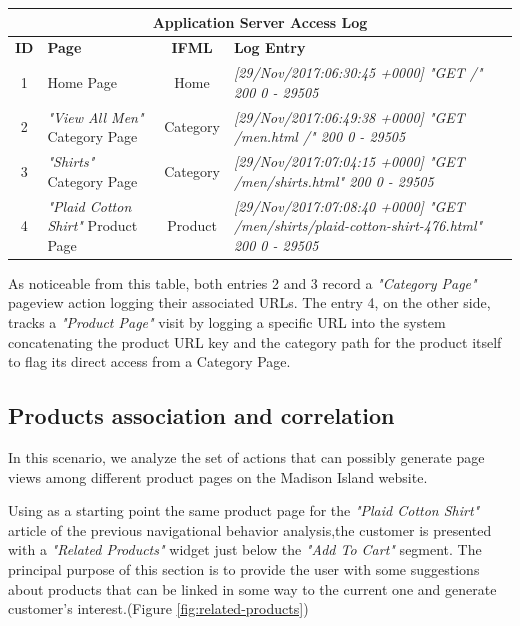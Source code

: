 \vspace{0.5cm}
\begin{center}
  \begin{tabular}{|c|p{3cm}|c|p{6cm}|}
  \hline
  \multicolumn{4}{|c|}{Application Server Access Log}\\ \hline
  \textbf{ID}&\textbf{Page}&\textbf{IFML}&\textbf{Log Entry}   \\ \hline
  1&Home Page&Home&\em[29/Nov/2017:06:30:45 +0000] "GET /" 200 0 - 29505 \\ \hline
  2&\textit{"View All Men"} Category Page &Category&\em[29/Nov/2017:06:49:38 +0000] "GET /men.html /" 200 0 - 29505 
  \\ \hline
  3&\textit{"Shirts"} Category Page &Category&\em[29/Nov/2017:07:04:15 +0000] "GET /men/shirts.html" 200 0 - 29505
  \\ \hline
  4&\textit{"Plaid Cotton Shirt"} Product Page &Product&\em[29/Nov/2017:07:08:40 +0000] "GET /men/shirts/plaid-cotton-shirt-476.html" 200 0 - 29505
  \\ \hline
  \end{tabular}
  \end{center}
  \vspace{0.5cm}

  As noticeable from this table, both entries 2 and 3 record a \textit{"Category Page"} pageview action logging their associated URLs. The entry 4, on the other side, tracks a \textit{"Product Page"} visit by logging a specific URL into the system concatenating the product URL key and the category path for the product itself to flag its direct access from a Category Page.


\subsection{Products association and correlation}

In this scenario, we analyze the set of actions that can possibly generate page views among different product pages on the Madison Island website. 

Using as a starting point the same product page for the \textit{"Plaid Cotton Shirt"} article of the previous navigational behavior analysis,the customer is presented with a \textit{"Related Products"} widget just below the \textit{"Add To Cart"} segment. The principal purpose of this section is to provide the user with some suggestions about products that can be linked in some way to the current one and generate customer's interest.(Figure \ref{fig:related-products})

